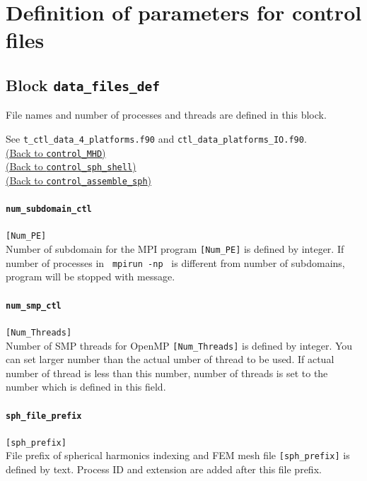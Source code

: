 \section{Definition of parameters for control files}
\label{section:def_control}

\subsection{Block {\tt data\_files\_def}}
\label{href_t:data_files_def}
File names and number of processes and threads are defined in this block. 

See \verb|t_ctl_data_4_platforms.f90| and \verb|ctl_data_platforms_IO.f90|.\\
\hyperref[href_i:MHD_control]{(Back to {\tt control\_MHD})} \\
\hyperref[href_i:spherical_shell_ctl]{(Back to {\tt control\_sph\_shell})} \\
\hyperref[href_i:assemble_control]{(Back to {\tt control\_assemble\_sph})}

\paragraph{\tt num\_subdomain\_ctl}
\label{href_t:num_subdomain_ctl}
\verb|[Num_PE]| \\
Number of subdomain for the MPI program \verb|[Num_PE]| is defined by integer. If number of processes in \verb| mpirun -np | is different from number of subdomains, program will be stopped with message.

\paragraph{\tt num\_smp\_ctl}
\label{href_t:num_smp_ctl}
\verb|[Num_Threads]| \\
Number of SMP threads for OpenMP \verb|[Num_Threads]| is defined by integer. You can set larger number than the actual umber of thread to be used. If actual number of thread is less than this number, number of threads is set to the number which is defined in this field.

\paragraph{\tt sph\_file\_prefix}
\label{href_t:sph_file_prefix}
\verb|[sph_prefix]| \\
File prefix of spherical harmonics indexing and FEM mesh file \verb|[sph_prefix]| is defined by text. Process ID and extension are added after this file prefix.

